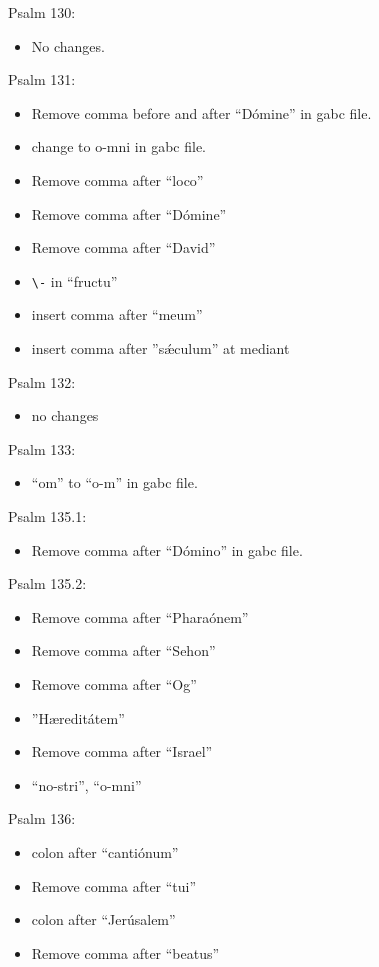 \documentclass[11pt]{article}
\begin{document}
  Psalm 130:
  \begin{itemize}
  \item 
No changes.
    \end{itemize}
  
      Psalm 131:
  \begin{itemize}
  \item Remove comma before and after ``Dómine'' in gabc file.
  \item
 change to o-mni  in gabc file.
  \item   Remove comma after ``loco''
  \item
  Remove comma after ``Dómine''
    \item
  Remove comma after ``David''
  \item
 \verb|\-| in ``fructu''
 \item insert comma after ``meum''
 \item insert comma after ''sǽculum'' at mediant
    \end{itemize}

Psalm 132:
  \begin{itemize}
  \item 
no changes
    \end{itemize}

 Psalm 133:
  \begin{itemize}
  \item 
``om'' to ``o-m'' in gabc file.
    \end{itemize}

Psalm 135.1:
  \begin{itemize}
  \item Remove comma after ``Dómino'' in gabc file.
    \end{itemize}

Psalm 135.2:
  \begin{itemize}
  \item Remove comma after ``Pharaónem''
  \item  Remove comma after ``Sehon''
   \item Remove comma after ``Og''
   \item ''Hæreditátem''
     \item Remove comma after ``Israel''
     \item
     ``no-stri'', ``o-mni''
    \end{itemize}

Psalm 136:
  \begin{itemize}
  \item colon after ``cantiónum''
    \item  Remove comma after ``tui''
  \item  colon after ``Jerúsalem''
  \item
  Remove comma after ``beatus''
    \end{itemize}
\end{document}
